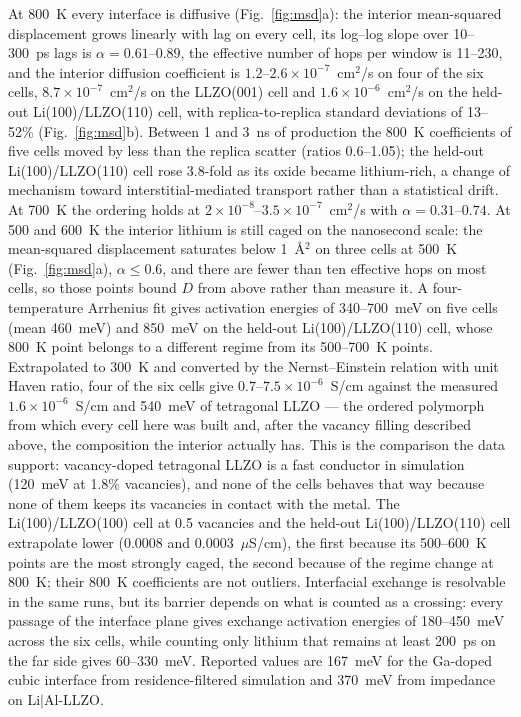 \documentclass[11pt]{article}
\begin{document}
At 800~K every interface is diffusive (Fig.~\ref{fig:msd}a): the interior
mean-squared displacement grows linearly with lag on every cell, its log--log
slope over 10--300~ps lags is $\alpha=0.61$--$0.89$, the
effective number of hops per window\citep{He2018} is 11--230, and the interior
diffusion coefficient is $1.2$--$2.6\times10^{-7}$~cm$^2$/s on four of the six
cells, $8.7\times10^{-7}$~cm$^2$/s on the LLZO(001) cell and
$1.6\times10^{-6}$~cm$^2$/s on the held-out Li(100)/LLZO(110) cell, with
replica-to-replica standard deviations of 13--52\% (Fig.~\ref{fig:msd}b).
Between 1 and 3~ns of production the 800~K coefficients of five cells moved by
less than the replica scatter (ratios 0.6--1.05); the held-out
Li(100)/LLZO(110) cell rose 3.8-fold as its oxide became lithium-rich, a change
of mechanism toward interstitial-mediated transport rather than a statistical
drift. At 700~K the ordering holds at $2\times10^{-8}$--$3.5\times10^{-7}$~cm$^2$/s
with $\alpha=0.31$--$0.74$. At 500 and 600~K the interior lithium is still caged on
the nanosecond scale: the mean-squared displacement saturates below
1~\AA$^2$ on three cells at 500~K (Fig.~\ref{fig:msd}a), $\alpha\leq0.6$, and
there are fewer than ten effective hops on most cells, so those points bound
$D$ from above rather than measure it. A
four-temperature Arrhenius fit gives activation energies of 340--700~meV on
five cells (mean 460~meV) and 850~meV on the held-out Li(100)/LLZO(110) cell,
whose 800~K point belongs to a different regime from its 500--700~K points.
Extrapolated to 300~K and converted by the Nernst--Einstein relation with unit
Haven ratio, four of the six cells give $0.7$--$7.5\times10^{-6}$~S/cm against
the measured $1.6\times10^{-6}$~S/cm and 540~meV of tetragonal
LLZO\citep{Awaka2009} --- the ordered polymorph from which every cell here was
built and, after the vacancy filling described above, the composition the
interior actually has. This is the comparison the data support: vacancy-doped
tetragonal LLZO is a fast conductor in simulation (120~meV at 1.8\%
vacancies\citep{burov2026}), and none of the cells behaves that way because
none of them keeps its vacancies in contact with the metal. The
Li(100)/LLZO(100) cell at 0.5 vacancies and the held-out Li(100)/LLZO(110)
cell extrapolate lower (0.0008 and 0.0003~$\mu$S/cm), the first because its
500--600~K points are the most strongly caged, the second because of the
regime change at 800~K; their 800~K coefficients are not outliers.
Interfacial exchange is resolvable in the same runs, but its barrier depends
on what is counted as a crossing: every passage of the interface plane gives
exchange activation energies of 180--450~meV across the six cells, while
counting only lithium that remains at least 200~ps on the far side gives
60--330~meV. Reported values are 167~meV for the Ga-doped cubic interface
from residence-filtered simulation\citep{burov2026} and 370~meV from
impedance on Li$|$Al-LLZO\citep{Krauskopf2019}.
\end{document}
